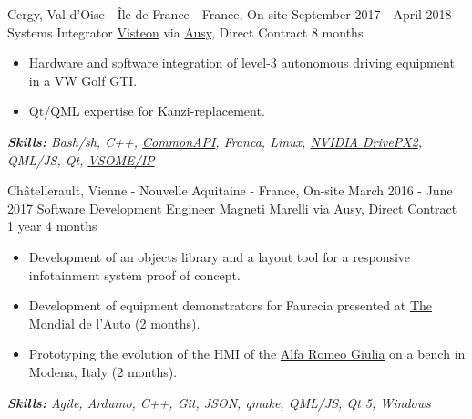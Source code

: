 \documentclass[11pt,a4paper,roman]{moderncv}
\begin{document}
\cventry
{Cergy, Val-d'Oise - Île-de-France - France, On-site}
{September 2017 - April 2018}
{Systems Integrator}
{\href{https://www.visteon.com}{Visteon} via \href{https://www.ausy.com/en}{Ausy}, Direct Contract}
{8 months}
{}
{
\begin{itemize}
	\item Hardware and software integration of level-3 autonomous driving equipment in a VW Golf GTI.
	\item Qt/QML expertise for Kanzi-replacement.
\end{itemize}
{\textcolor{color2}{\textit{\textbf{Skills:}
	Bash/sh,
	C++,
	\href{https://github.com/GENIVI/capicxx-core-runtime}{CommonAPI},
	Franca,
	Linux,
	\href{https://www.nvidia.com/content/nvidiaGDC/sg/en_SG/self-driving-cars/drive-px/}{NVIDIA Drive\texttrademark PX2},
	QML/JS,
	Qt,
	\href{https://github.com/GENIVI/vsomeip}{VSOME/IP}
	\newline
}}}}


\cventry
{Châtellerault, Vienne - Nouvelle Aquitaine - France, On-site}
{March 2016 - June 2017}
{Software Development Engineer}
{\href{https://www.marelli.com}{Magneti Marelli} via \href{https://www.ausy.com/en}{Ausy}, Direct Contract}
{1 year 4 months}
{}
{
\begin{itemize}
	\item Development of an objects library and a layout tool for a responsive infotainment system proof of concept.
	\item Development of equipment demonstrators for Faurecia presented at \href{https://mondial.paris/en/mondial-de-lauto}{The Mondial de l'Auto} (2 months).
	\item Prototyping the evolution of the HMI of the \href{https://www.alfaromeo.com/giulia}{Alfa Romeo Giulia} on a bench in Modena, Italy (2 months).
\end{itemize}
{\textcolor{color2}{\textit{\textbf{Skills:}
	Agile,
	Arduino,
	C++,
	Git,
	JSON,
	qmake,
	QML/JS,
	Qt 5,
	Windows
	\newline
}}}}
\end{document}
